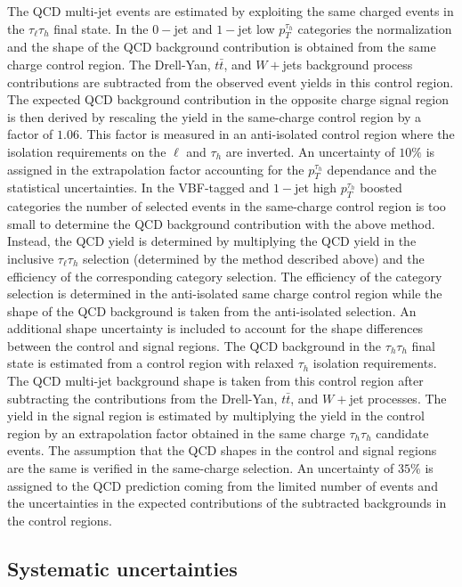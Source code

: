 The QCD multi-jet events are estimated by exploiting the same charged events in the $\tau_{\ell}\tau_h$ final state. In the $0-$jet and $1-$jet low $p_{T}^{\tau_h}$ categories the normalization and the shape  of the QCD background contribution is obtained from the same charge control region. The Drell-Yan, $t\bar{t}$, and $W+$jets background process contributions are subtracted from the observed event yields in this control region. The expected QCD background contribution in the opposite charge signal region is then derived by rescaling the yield in the same-charge control region by a factor of $1.06$. This factor is measured in an anti-isolated control region where the isolation requirements on the $\ell$ and $\tau_h$ are inverted. An uncertainty of $10\%$ is assigned in the extrapolation factor accounting for the $p_{T}^{\tau_h}$ dependance and the statistical uncertainties. In the VBF-tagged and $1-$jet high $p_{T}^{\tau_h}$ boosted categories the number of selected events in the same-charge control region is too small to determine the QCD background contribution with the above method. Instead, the QCD yield is determined by multiplying the QCD yield in the inclusive $\tau_{\ell}\tau_h$ selection (determined by the method described above) and the efficiency of the corresponding category selection. The efficiency of the category selection is determined in the anti-isolated same charge control region while  the shape of the QCD background is taken from the anti-isolated selection. An additional shape uncertainty is included to account for the shape differences between the control and signal regions. The QCD background in the $\tau_h\tau_h$ final state is estimated from a control region with relaxed $\tau_h$ isolation requirements. The QCD multi-jet background shape is taken from this control region after subtracting the contributions from the Drell-Yan, $t\bar{t}$, and $W+$jet processes. The yield in the signal region is estimated by multiplying the yield in the control region by an extrapolation factor obtained in the same charge $\tau_h\tau_h$ candidate events. The assumption that the QCD shapes in the control and signal regions are the same is verified in the same-charge selection.  An uncertainty of $35\%$ is assigned to the QCD prediction coming from the limited number of events and the uncertainties in the expected contributions of the subtracted backgrounds in the control regions.   

\subsection{Systematic uncertainties}

